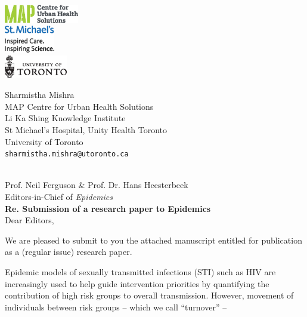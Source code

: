 \documentclass[a4]{article}
\begin{document}
\begin{minipage}{0.5\linewidth}
  \includegraphics[height=0.8cm]{map-cuhs.eps}\\[1em]
  \includegraphics[height=1.2cm]{smh.eps}\\[1em]
  \includegraphics[height=1cm]{uoft.eps}
\end{minipage}%
\begin{minipage}{0.5\linewidth}
  \begin{flushright}
    Sharmistha Mishra\\
    MAP Centre for Urban Health Solutions\\
    Li Ka Shing Knowledge Institute\\
    St Michael's Hospital,
    Unity Health Toronto\\
    University of Toronto\\
    \texttt{sharmistha.mishra@utoronto.ca}
  \end{flushright}
\end{minipage}
\\[2em]
Prof. Neil Ferguson \& Prof. Dr. Hans Heesterbeek\\
Editors-in-Chief of \textit{Epidemics}\\[1em]
\textbf{Re. Submission of a research paper to Epidemics}\\[1em]
Dear Editors,
\par
We are pleased to submit to you the attached manuscript entitled
\textit{}%
for publication as a (regular issue) research paper.
\par
Epidemic models of sexually transmitted infections (STI) such as HIV
are increasingly used to help guide intervention priorities
by quantifying the contribution of high risk groups to overall transmission.
However, movement of individuals between risk groups
-- which we call ``turnover'' --
\end{document}
